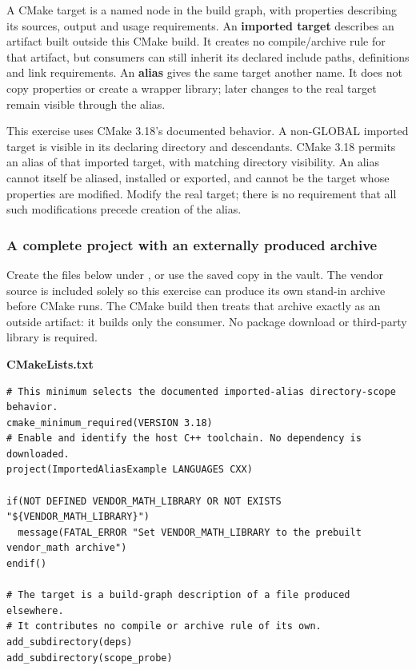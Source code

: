 \hypertarget{05-engine-i-ch012-imported-targets-describe-external-artifacts-aliases-provide-a-stable-name}{}

A CMake target is a named node in the build graph, with properties describing its sources, output and usage requirements. An \textbf{imported target} describes an artifact built outside this CMake build. It creates no compile/archive rule for that artifact, but consumers can still inherit its declared include paths, definitions and link requirements. An \textbf{alias} gives the same target another name. It does not copy properties or create a wrapper library; later changes to the real target remain visible through the alias.

This exercise uses CMake 3.18's documented behavior. A non-GLOBAL imported target is visible in its declaring directory and descendants. CMake 3.18 permits an alias of that imported target, with matching directory visibility. An alias cannot itself be aliased, installed or exported, and cannot be the target whose properties are modified. Modify the real target; there is no requirement that all such modifications precede creation of the alias.

\subsubsection{A complete project with an externally produced archive}\label{05-engine-i-ch012-a-complete-project-with-an-externally-produced-archive}

\hypertarget{05-engine-i-ch012-a-complete-project-with-an-externally-produced-archive}{}

Create the files below under , or use the saved copy in the vault. The vendor source is included solely so this exercise can produce its own stand-in archive before CMake runs. The CMake build then treats that archive exactly as an outside artifact: it builds only the consumer. No package download or third-party library is required.

\textbf{CMakeLists.txt}

\begin{verbatim}
# This minimum selects the documented imported-alias directory-scope behavior.
cmake_minimum_required(VERSION 3.18)
# Enable and identify the host C++ toolchain. No dependency is downloaded.
project(ImportedAliasExample LANGUAGES CXX)

if(NOT DEFINED VENDOR_MATH_LIBRARY OR NOT EXISTS "${VENDOR_MATH_LIBRARY}")
  message(FATAL_ERROR "Set VENDOR_MATH_LIBRARY to the prebuilt vendor_math archive")
endif()

# The target is a build-graph description of a file produced elsewhere.
# It contributes no compile or archive rule of its own.
add_subdirectory(deps)
add_subdirectory(scope_probe)
\end{verbatim}

